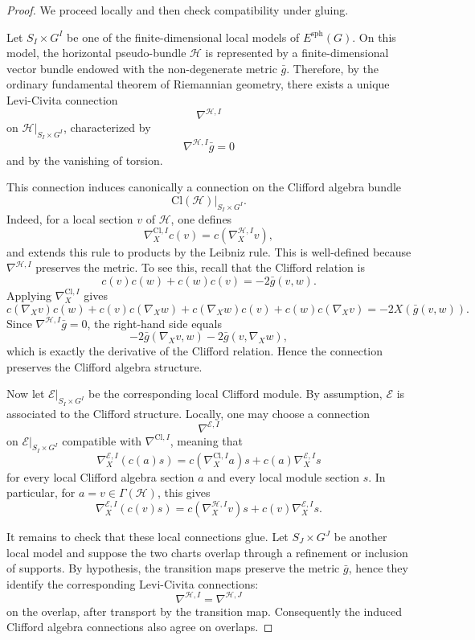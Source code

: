 \documentclass[11pt]{amsart}
\begin{document}
\begin{proof}
We proceed locally and then check compatibility under gluing.

Let \(S_I\times G^I\) be one of the finite-dimensional local models of
\(E^{\mathrm{sph}}(G)\). On this model, the horizontal pseudo-bundle
\(\mathcal H\) is represented by a finite-dimensional vector bundle endowed
with the non-degenerate metric \(\bar g\). Therefore, by the ordinary
fundamental theorem of Riemannian geometry, there exists a unique
Levi-Civita connection
\[
\nabla^{\mathcal H,I}
\]
on \(\mathcal H|_{S_I\times G^I}\), characterized by
\[
\nabla^{\mathcal H,I}\bar g=0
\]
and by the vanishing of torsion.

This connection induces canonically a connection on the Clifford algebra
bundle
\[
\mathrm{Cl}(\mathcal H)|_{S_I\times G^I}.
\]
Indeed, for a local section \(v\) of \(\mathcal H\), one defines
\[
\nabla^{\mathrm{Cl},I}_X c(v)
=
c(\nabla^{\mathcal H,I}_X v),
\]
and extends this rule to products by the Leibniz rule. This is well-defined
because \(\nabla^{\mathcal H,I}\) preserves the metric. To see this, recall
that the Clifford relation is
\[
c(v)c(w)+c(w)c(v)=-2\bar g(v,w).
\]
Applying \(\nabla^{\mathrm{Cl},I}_X\) gives
\[
c(\nabla_X v)c(w)+c(v)c(\nabla_X w)
+
c(\nabla_X w)c(v)+c(w)c(\nabla_X v)
=
-2X(\bar g(v,w)).
\]
Since \(\nabla^{\mathcal H,I}\bar g=0\), the right-hand side equals
\[
-2\bar g(\nabla_X v,w)-2\bar g(v,\nabla_X w),
\]
which is exactly the derivative of the Clifford relation. Hence the
connection preserves the Clifford algebra structure.

Now let \(\mathcal E|_{S_I\times G^I}\) be the corresponding local
Clifford module. By assumption, \(\mathcal E\) is associated to the
Clifford structure. Locally, one may choose a connection
\[
\nabla^{\mathcal E,I}
\]
on \(\mathcal E|_{S_I\times G^I}\) compatible with
\(\nabla^{\mathrm{Cl},I}\), meaning that
\[
\nabla^{\mathcal E,I}_X(c(a)s)
=
c(\nabla^{\mathrm{Cl},I}_X a)s
+
c(a)\nabla^{\mathcal E,I}_X s
\]
for every local Clifford algebra section \(a\) and every local module
section \(s\). In particular, for \(a=v\in\Gamma(\mathcal H)\), this gives
\[
\nabla^{\mathcal E,I}_X(c(v)s)
=
c(\nabla^{\mathcal H,I}_X v)s
+
c(v)\nabla^{\mathcal E,I}_X s.
\]

It remains to check that these local connections glue. Let
\(S_J\times G^J\) be another local model and suppose the two charts overlap
through a refinement or inclusion of supports. By hypothesis, the transition
maps preserve the metric \(\bar g\), hence they identify the corresponding
Levi-Civita connections:
\[
\nabla^{\mathcal H,I}
=
\nabla^{\mathcal H,J}
\]
on the overlap, after transport by the transition map. Consequently the
induced Clifford algebra connections also agree on overlaps.


\end{proof}
\end{document}
